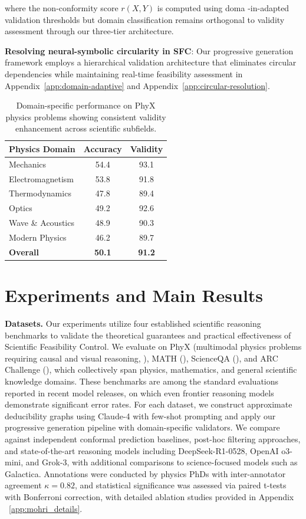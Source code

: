 \documentclass{uai2026} %
\theoremstyle{remark}
\theoremstyle{plain}
\theoremstyle{definition}
\begin{document}
where the non-conformity score $r(X,Y)$ is computed using doma
-in-adapted validation thresholds but domain classification remains orthogonal to validity assessment through our three-tier architecture.

\textbf{Resolving neural-symbolic circularity in SFC}: Our progressive generation framework employs a hierarchical validation architecture that eliminates circular dependencies while maintaining real-time feasibility assessment in Appendix~\ref{app:domain-adaptive} and Appendix~\ref{app:circular-resolution}.
\begin{table}[ht]
\centering
\caption{Domain-specific performance on PhyX physics problems showing consistent validity enhancement across scientific subfields.}
\label{tab:phyx_domains}
\begin{tabular}{l|cc}
\hline
Physics Domain & Accuracy & Validity \\
\hline
Mechanics & 54.4 & 93.1  \\
Electromagnetism & 53.8 & 91.8  \\
Thermodynamics & 47.8 & 89.4  \\
Optics & 49.2 & 92.6  \\
Wave \& Acoustics & 48.9 & 90.3  \\
Modern Physics & 46.2 & 89.7  \\
\hline
\textbf{Overall} & \textbf{50.1} & \textbf{91.2}  \\
\hline
\end{tabular}
\end{table}


\section{Experiments and Main Results}
\textbf{Datasets.} Our experiments utilize four established scientific reasoning benchmarks to validate the theoretical guarantees and practical effectiveness of Scientific Feasibility Control. We evaluate on PhyX (multimodal physics problems requiring causal and visual reasoning, \citet{shen2025phyx}), MATH (\citet{hendrycksmath2021}), ScienceQA (\citet{lu2022learn}), and ARC Challenge (\citet{allenai:arc}), which collectively span physics, mathematics, and general scientific knowledge domains. These benchmarks are among the standard evaluations reported in recent model releases, on which even frontier reasoning models demonstrate significant error rates. For each dataset, we construct approximate deducibility graphs using Claude-4 with few-shot prompting and apply our progressive generation pipeline with domain-specific validators. We compare against independent conformal prediction baselines, post-hoc filtering approaches, and state-of-the-art reasoning models including DeepSeek-R1-0528, OpenAI o3-mini, and Grok-3, with additional comparisons to science-focused models such as Galactica. Annotations were conducted by physics PhDs with inter-annotator agreement $\kappa = 0.82$, and statistical significance was assessed via paired t-tests with Bonferroni correction, with detailed ablation studies provided in Appendix ~\ref{app:mohri_details}.
\end{document}
